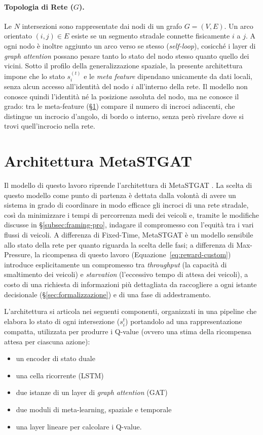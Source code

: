 \paragraph{Topologia di Rete ($G$).} Le $N$ intersezioni sono rappresentate dai nodi di un grafo $G=(V,E)$.
Un arco orientato $(i,j) \in E$ esiste se un segmento stradale connette fisicamente $i$ a $j$.
A ogni nodo è inoltre aggiunto un arco verso se stesso (\emph{self-loop}), cosicché i layer di \emph{graph attention} possano pesare tanto lo stato del nodo stesso quanto quello dei vicini.
Sotto il profilo della generalizzazione spaziale, la presente architettura impone che
lo stato $s_i^{(t)}$ e le \emph{meta feature} dipendano unicamente da dati locali,
senza alcun accesso all'identità del nodo $i$ all'interno della rete.
Il modello non conosce quindi l'identità né la posizione assoluta del
nodo, ma ne conosce il grado: tra le meta-feature (§\ref{sec:architettura})
compare il numero di incroci adiacenti, che distingue un incrocio
d'angolo, di bordo o interno, senza però rivelare dove si trovi
quell'incrocio nella rete.

\section{Architettura MetaSTGAT}
\label{sec:architettura}

Il modello di questo lavoro riprende l'architettura di MetaSTGAT
\citep{wang2022metastgat}. La scelta di questo modello come punto di
partenza è dettata dalla volontà di avere un sistema in grado di
coordinare in modo efficace gli incroci di una rete stradale, così da
minimizzare i tempi di percorrenza medi dei veicoli e, tramite le
modifiche discusse in §\ref{subsec:framing-pro}, indagare il compromesso
con l'equità tra i vari flussi di veicoli. A differenza di Fixed-Time,
MetaSTGAT è un modello sensibile allo stato della rete per quanto
riguarda la scelta delle fasi; a differenza di Max-Pressure, la
ricompensa di questo lavoro (Equazione~\ref{eq:reward-custom}) introduce
esplicitamente un compromesso tra \emph{throughput} (la capacità di
smaltimento dei veicoli) e \emph{starvation} (l'eccessivo tempo di
attesa dei veicoli), a costo di una richiesta di informazioni più
dettagliata da raccogliere a ogni istante decisionale
(§\ref{sec:formalizzazione}) e di una fase di addestramento.

L'architettura si articola nei seguenti componenti, organizzati in una pipeline
che elabora lo stato di ogni intersezione ($s_i^t$) portandolo ad una rappresentazione compatta,
utilizzata per produrre i Q-value (ovvero una stima della ricompensa attesa per ciascuna azione):
\begin{itemize}
  \item un encoder di stato duale
  \item una cella ricorrente (LSTM)
  \item due istanze di un layer di \emph{graph attention} (GAT)
  \item due moduli di meta-learning, spaziale e temporale
  \item una layer lineare per calcolare i Q-value.
\end{itemize}

